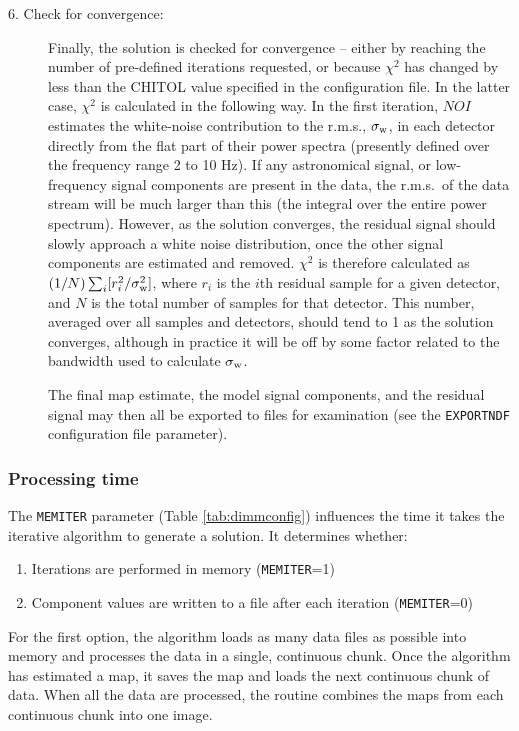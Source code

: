 \documentclass[twoside,11pt]{article}
\renewcommand{\_}{\texttt{\symbol{95}}}
\newcommand{\cparam}[1]{\texttt{#1}}     %
\begin{document}
\begin{description}
\item[6. Check for convergence:] Finally, the solution is checked for
  convergence -- either by reaching the number of pre-defined
  iterations requested, or because $\chi^2$ has changed by less than
  the CHITOL value specified in the configuration file. In the latter
  case, $\chi^2$ is calculated in the following way. In the first
  iteration, $NOI$ estimates the white-noise contribution to the
  r.m.s., $\sigma_{\rm w}$, in each detector directly from the flat
  part of their power spectra (presently defined over the frequency
  range 2 to 10 Hz). If any astronomical signal, or low-frequency
  signal components are present in the data, the r.m.s.\ of the data
  stream will be much larger than this (the integral over the entire
  power spectrum). However, as the solution converges, the residual
  signal should slowly approach a white noise distribution, once the
  other signal components are estimated and removed. $\chi^2$ is
  therefore calculated as $(1/N) \sum_i[ r_i^2/\sigma^2_{\rm w}]$,
  where $r_i$ is the $i$th residual sample for a given detector, and
  $N$ is the total number of samples for that detector. This number,
  averaged over all samples and detectors, should tend to 1 as the
  solution converges, although in practice it will be off by some
  factor related to the bandwidth used to calculate $\sigma_{\rm w}$.

  The final map estimate, the model signal components, and the
  residual signal may then all be exported to files for examination
  (see the \cparam{EXPORTNDF} configuration file parameter).

\end{description}

\subsubsection{Processing time}

The \cparam{MEMITER} parameter (Table \ref{tab:dimmconfig}) influences
the time it takes the iterative algorithm to generate a solution. It
determines whether:
\begin{enumerate}
\item Iterations are performed in memory (\cparam{MEMITER}=1)
\item Component values are written to a file after each iteration
  (\cparam{MEMITER}=0)
\end{enumerate}

For the first option, the algorithm loads as many data files as
possible into memory and processes the data in a single, continuous
chunk. Once the algorithm has estimated a map, it saves the map and
loads the next continuous chunk of data. When all the data are
processed, the routine combines the maps from each continuous chunk
into one image.
\end{document}
